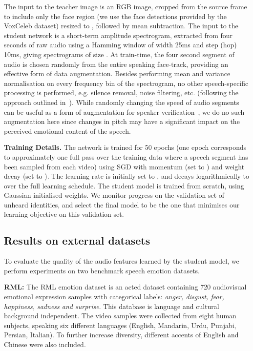 \documentclass[sigconf]{acmart}
\begin{document}
The input to the teacher image is an RGB image, cropped from the source frame to include only the face region (we use the face detections provided by the VoxCeleb dataset) resized to , followed by mean subtraction. The input to the student network is a short-term amplitude spectrogram, extracted from four seconds of raw audio using a Hamming window of width 25ms and step (hop) 10ms, giving spectrograms of size . At train-time, the four second segment of audio is chosen randomly from the entire speaking face-track, providing an effective form of data augmentation. Besides performing mean and variance normalisation on every frequency bin of the spectrogram, no other speech-specific processing is performed, e.g. silence removal, noise filtering, etc. (following the approach outlined in~\cite{Nagrani17}). While randomly changing the speed of audio segments can be useful as a form of augmentation for speaker verification~\cite{Nagrani17}, we do no such augmentation here since changes in pitch may have a significant impact on the perceived emotional content of the speech.

\noindent \textbf{Training Details.} The network is trained for 50 epochs (one epoch corresponds to approximately one full pass over the training data where a speech segment has been sampled from each video) using SGD with momentum (set to ) and weight decay (set to ). The learning rate is initially set to , and decays logarithmically to  over the full learning schedule. The student model is trained from scratch, using Gaussian-initialised weights. We monitor progress on the validation set of unheard identities, and select the final model to be the one that minimises our learning objective on this validation set. 

\subsection{Results on external datasets\label{sec:external}}

To evaluate the quality of the audio features learned by the student model, we perform experiments on two benchmark speech emotion datasets.

\noindent\textbf{RML:} The RML emotion dataset is an acted dataset containing 720 audiovisual emotional expression samples with categorical labels: \textit{anger, disgust, fear, happiness, sadness and surprise}. This database is language and cultural background independent. The video samples were collected from eight human subjects, speaking six different languages (English, Mandarin, Urdu, Punjabi, Persian, Italian). To further increase diversity, different accents of English and Chinese were also included.
\end{document}
